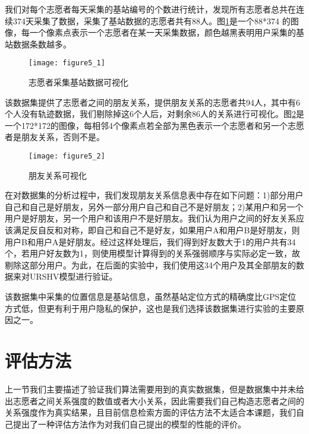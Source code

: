 \par 我们对每个志愿者每天采集的基站编号的个数进行统计，发现所有志愿者总共在连续374天采集了数据，采集了基站数据的志愿者共有88人。图\ref{fig:5_1}是一个88*374 的图像，每一个像素点表示一个志愿者在某一天采集数据，颜色越黑表明用户采集的基站数据条数越多。
\begin{figure}[htp]
\centering
\texttt{[image: figure5\_1]}
\caption{志愿者采集基站数据可视化}
\label{fig:5_1}
\end{figure}
\par 该数据集提供了志愿者之间的朋友关系，提供朋友关系的志愿者共94人，其中有6个人没有轨迹数据，我们剔除掉这6个人后，对剩余86人的关系进行可视化。图\ref{fig:5_2}是一个172*172的图像，每相邻4个像素点若全部为黑色表示一个志愿者和另一个志愿者是朋友关系，否则不是。
\begin{figure}[htp]
\centering
\texttt{[image: figure5\_2]}
\caption{朋友关系可视化}
\label{fig:5_2}
\end{figure}
\par 在对数据集的分析过程中，我们发现朋友关系信息表中存在如下问题：1)部分用户自己和自己是好朋友，另外一部分用户自己和自己不是好朋友；2)某用户和另一个用户是好朋友，另一个用户和该用户不是好朋友。我们认为用户之间的好友关系应该满足反自反和对称，即自己和自己不是好友，如果用户A和用户B是好朋友，则用户B和用户A是好朋友。经过这样处理后，我们得到好友数大于1的用户共有34个，若用户好友数为1，则使用模型计算得到的关系强弱顺序与实际必定一致，故剔除这部分用户。为此，在后面的实验中，我们使用这34个用户及其全部朋友的数据来对URSHV模型进行验证。
\par 该数据集中采集的位置信息是基站信息，虽然基站定位方式的精确度比GPS定位方式低，但更有利于用户隐私的保护，这也是我们选择该数据集进行实验的主要原因之一。
\section{评估方法}
\label{sec:section5-2}
上一节我们主要描述了验证我们算法需要用到的真实数据集，但是数据集中并未给出志愿者之间关系强度的数值或者大小关系，因此需要我们自己构造志愿者之间的关系强度作为真实结果，且目前信息检索方面的评估方法不太适合本课题，我们自己提出了一种评估方法作为对我们自己提出的模型的性能的评价。
